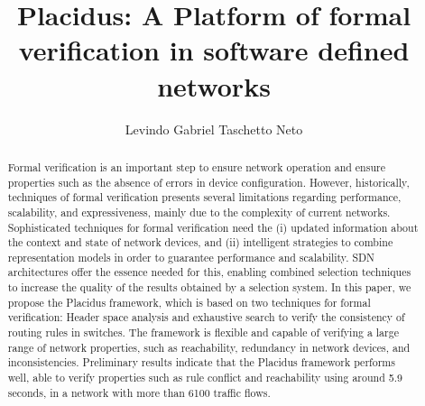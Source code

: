 \documentclass[12pt]{article}
\title{Placidus: A Platform of formal verification in software defined networks}
\author{Levindo Gabriel Taschetto Neto\inst{1}}
\begin{document}
 

\maketitle

\begin{abstract}
Formal verification is an important step to ensure network operation and ensure properties such as the absence of errors in device configuration. However, historically, techniques of formal verification presents several limitations regarding performance, scalability, and expressiveness, mainly due to the complexity of current networks. Sophisticated techniques for formal verification need the (i) updated information about the context and state of network devices, and (ii) intelligent strategies to combine representation models in order to guarantee performance and scalability. SDN architectures offer the essence needed for this, enabling combined selection techniques to increase the quality of the results obtained by a selection system. In this paper, we propose the Placidus framework, which is based on two techniques for formal verification: Header space analysis and exhaustive search to verify the consistency of routing rules in switches. The framework is flexible and capable of verifying a large range of network properties, such as reachability, redundancy in network devices, and inconsistencies. Preliminary results indicate that the Placidus framework performs well, able to verify properties such as rule conflict and reachability using around 5.9 seconds, in a network with more than 6100 traffic flows.
\end{abstract}
\end{document}
